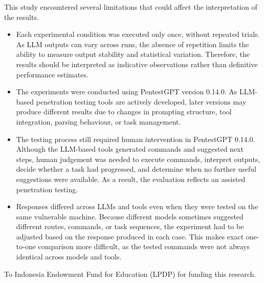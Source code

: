 \documentclass[acmtog]{acmart}
\begin{document}
This study encountered several limitations that could affect the interpretation of the results.
\begin{itemize}
  \item Each experimental condition was executed only once, without repeated trials. As LLM outputs can vary across runs, the absence of repetition limits the ability to measure output stability and statistical variation. Therefore, the results should be interpreted as indicative observations rather than definitive performance estimates.

  \item The experiments were conducted using PentestGPT version 0.14.0. As LLM-based penetration testing tools are actively developed, later versions may produce different results due to changes in prompting structure, tool integration, parsing behaviour, or task management.

  \item The testing process still required human intervention in PentestGPT 0.14.0. Although the LLM-based tools generated commands and suggested next steps, human judgement was needed to execute commands, interpret outputs, decide whether a task had progressed, and determine when no further useful suggestions were available. As a result, the evaluation reflects an assisted penetration testing.

  \item Responses differed across LLMs and tools even when they were tested on the same vulnerable machine. Because different models sometimes suggested different routes, commands, or task sequences, the experiment had to be adjusted based on the response produced in each case. This makes exact one-to-one comparison more difficult, as the tested commands were not always identical across models and tools.
\end{itemize}
\begin{acks}
  To Indonesia Endowment Fund for Education (LPDP) for funding this research.
\end{acks}





\appendix
\end{document}
